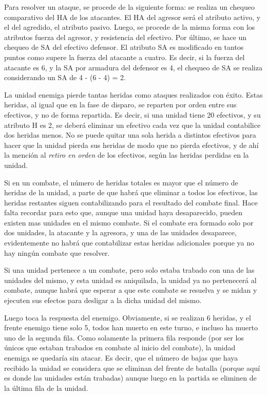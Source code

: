 Para resolver un ataque, se procede de la siguiente forma: se realiza
un chequeo comparativo del HA de los atacantes. El HA del agresor será
el atributo activo, y el del agredido, el atributo pasivo. Luego, se
procede de la misma forma con los atributos fuerza del agresor, y
resistencia del efectivo. Por último, se hace un chequeo de SA del
efectivo defensor. El atributo SA es modificado en tantos puntos como
supere la fuerza del atacante a cuatro. Es decir, si la fuerza del
atacante es 6, y la SA por armadura del defensor es 4, el chequeo de
SA se realiza considerando un SA de 4 - (6 - 4) = 2.

La unidad enemiga pierde tantas heridas como ataques realizados con
éxito. Estas heridas, al igual que en la fase de disparo, se reparten
por orden entre sus efectivos, y no de forma repartida. Es decir, si
una unidad tiene 20 efectivos, y su atributo H es 2, se deberá
eliminar un efectivo cada vez que la unidad contabilice dos heridas
menos. No se puede quitar una sola herida a distintos efectivos para
hacer que la unidad pierda sus heridas de modo que no pierda
efectivos, y de ahí la mención al \emph{retiro en orden} de los
efectivos, según las heridas perdidas en la unidad.

Si en un combate, el número de heridas totales es mayor que el número
de heridas de la unidad, a parte de que habrá que eliminar a todos los
efectivos, las heridas restantes siguen contabilizando para el
resultado del combate final. Hace falta recordar para esto que, aunque una unidad haya
desaparecido, pueden existen mas unidades en el mismo combate. Si el
combate era formado solo por dos unidades, la atacante y la agresora,
y una de las unidades desaparece, evidentemente no habrá que
contabilizar estas heridas adicionales porque ya no hay ningún combate
que resolver.

Si una unidad pertenece a un combate, pero solo estaba trabado con una
de las unidades del mismo, y esta unidad es aniquilada, la unidad ya
no pertenecerá al combate, aunque habrá que esperar a que este combate
se resuelva y se midan y ejecuten sus efectos para desligar a la
dicha unidad del mismo.

Luego toca la respuesta del enemigo. Obviamente, si se realizan 6
heridas, y el frente enemigo tiene solo 5, todos han muerto en este
turno, e incluso ha muerto uno de la segunda fila. Como solamente la
primera fila responde (por ser los únicos que estaban trabados en
combate al inicio del combate), la unidad enemiga se quedaría sin
atacar. Es decir, que el número de bajas que haya recibido la unidad
se considera que se eliminan del frente de batalla (porque aquí es
donde las unidades están trabadas) aunque luego en la partida se
eliminen de la última fila de la unidad.

